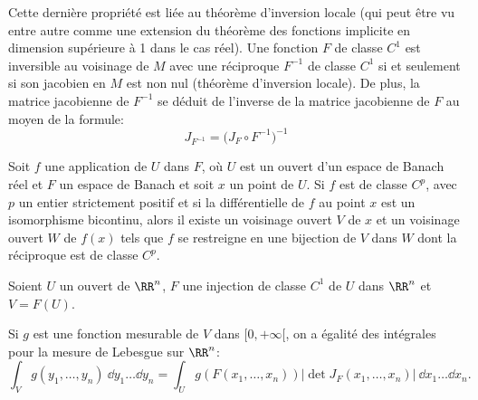 \medskipvm
{}
Cette dernière propriété est liée au théorème d'inversion locale (qui peut être vu entre autre
comme une extension du théorème des fonctions implicite en dimension supérieure à 1 dans le cas réel).
\medskipvm
Une fonction $F$ de classe $C^1$ est inversible au voisinage de $M$ avec une réciproque $F^{-1}$ 
de classe $C^1$ si et seulement si son jacobien en $M$ est non nul (théorème d'inversion locale). 
De plus, la matrice jacobienne de $F^{-1}$ se déduit de l'inverse de la matrice jacobienne de $F$ 
au moyen de la formule:
\begin{equation}J_{F^{-1}} = \bigl( J_F \circ F^{-1} \bigr)^{-1}\end{equation}

\begin{theoreme}
Soit $f$ une application de $U$ dans $F$, où $U$ est un ouvert d'un espace de Banach réel et 
$F$ un espace de Banach et soit $x$ un point de $U$.
Si $f$ est de classe $C^p$, avec $p$ un entier strictement positif et si la différentielle de $f$ au point 
$x$ est un isomorphisme bicontinu, alors il existe un voisinage ouvert $V$ de $x$ et un voisinage ouvert 
$W$ de $f(x)$ tels que $f$ se restreigne en une bijection de $V$ dans $W$ dont la réciproque est de 
classe $C^p$.
\end{theoreme}
\medskipvm
{}
\medskipvm
\begin{theoreme}

Soient $U$ un ouvert de $\RR^n$, $F$ une injection de classe $C^1$ de $U$ dans $\RR^n$ et $V=F(U)$.

Si $g$ est une fonction mesurable de $V$ dans $[0,+\infty[$, on a égalité des intégrales pour la mesure 
de Lebesgue sur $\RR^n$:
\begin{equation}   \int_V g(y_1,\ldots,y_n)~\dd y_1\ldots\dd y_n = \int_U g\left(F\left(x_1,\ldots,x_n\right)\right) 
\left|\det J_F(x_1,\ldots,x_n)\right|~\dd x_1\ldots\dd x_n.
\end{equation}
\end{theoreme}
\medskipvm
{}

